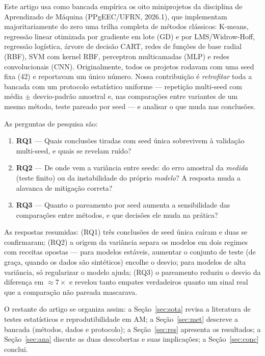\documentclass[12pt]{article}
\begin{document}
Este artigo usa como bancada empírica os oito miniprojetos da disciplina de
Aprendizado de Máquina (PPgEEC/UFRN, 2026.1), que implementam
majoritariamente do zero uma trilha completa de métodos clássicos: K-means,
regressão linear otimizada por gradiente em lote (GD) e por LMS/Widrow-Hoff,
regressão logística, árvore de decisão CART, redes de funções de base radial
(RBF), SVM com kernel RBF, perceptron multicamadas (MLP) e redes
convolucionais (CNN). Originalmente, todos os projetos rodavam com uma seed
fixa (42) e reportavam um único número. Nossa contribuição é
\emph{retrofitar} toda a bancada com um protocolo estatístico uniforme ---
repetição multi-seed com média $\pm$ desvio-padrão amostral e, nas
comparações entre variantes de um mesmo método, teste pareado por seed --- e
analisar o que muda nas conclusões.

As perguntas de pesquisa são:

\begin{enumerate}
  \item \textbf{RQ1} --- Quais conclusões tiradas com seed única sobrevivem à
        validação multi-seed, e quais se revelam ruído?
  \item \textbf{RQ2} --- De onde vem a variância entre seeds: do erro amostral
        da \emph{medida} (teste finito) ou da instabilidade do próprio
        \emph{modelo}? A resposta muda a alavanca de mitigação correta?
  \item \textbf{RQ3} --- Quanto o pareamento por seed aumenta a sensibilidade
        das comparações entre métodos, e que decisões ele muda na prática?
\end{enumerate}

As respostas resumidas: (RQ1) três conclusões de seed única caíram e duas se
confirmaram; (RQ2) a origem da variância separa os modelos em dois regimes
com receitas opostas --- para modelos estáveis, aumentar o conjunto de teste
(de graça, quando os dados são sintéticos) encolhe o desvio; para modelos de
alta variância, só regularizar o modelo ajuda; (RQ3) o pareamento reduziu o
desvio da diferença em $\approx 7\times$ e revelou tanto empates verdadeiros
quanto um sinal real que a comparação não pareada mascarava.

O restante do artigo se organiza assim: a Seção~\ref{sec:sota} revisa a
literatura de testes estatísticos e reprodutibilidade em AM; a
Seção~\ref{sec:met} descreve a bancada (métodos, dados e protocolo); a
Seção~\ref{sec:res} apresenta os resultados; a Seção~\ref{sec:ana} discute as
duas descobertas e suas implicações; a Seção~\ref{sec:conc} conclui.
\end{document}
